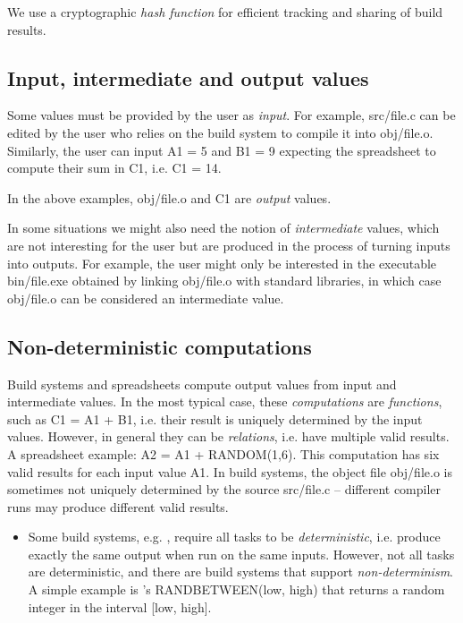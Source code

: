 We use a cryptographic \emph{hash function}  for
efficient tracking and sharing of build results.

\subsection{Input, intermediate and output values}

Some values must be provided by the user as \emph{input}. For example,
\textsf{src/file.c} can be edited by the user who relies on the build system to
compile it into \textsf{obj/file.o}. Similarly, the user can input \textsf{A1 = 5}
and \textsf{B1 = 9} expecting the spreadsheet to compute their sum in \textsf{C1},
i.e. \textsf{C1 = 14}.

In the above examples, \textsf{obj/file.o} and \textsf{C1} are \emph{output} values.

In some situations we might also need the notion of \emph{intermediate} values,
which are not interesting for the user but are produced in the process of turning
inputs into outputs. For example, the user might only be interested in the
executable \textsf{bin/file.exe} obtained by linking \textsf{obj/file.o} with
standard libraries, in which case \textsf{obj/file.o} can be considered an
intermediate value.

\subsection{Non-deterministic computations}

Build systems and spreadsheets compute output values from input and intermediate
values. In the most typical case, these \emph{computations} are \emph{functions},
such as \textsf{C1 = A1 + B1}, i.e. their result is uniquely determined by the
input values. However, in general they can be \emph{relations}, i.e. have
multiple valid results. A spreadsheet example: \textsf{A2 = A1 + RANDOM(1,6)}.
This computation has six valid results for each input value \textsf{A1}. In
build systems, the object file \textsf{obj/file.o} is sometimes not uniquely
determined by the source \textsf{src/file.c} -- different compiler runs may
produce different valid results.


\begin{itemize}

    \item Some build systems, e.g. \Buck, require all tasks to be
    \emph{deterministic}, i.e. produce exactly the same output when run on the
    same inputs. However, not all tasks are deterministic, and there are build
    systems that support \emph{non-determinism}. A simple example is \Excel's
    \textsf{RANDBETWEEN(low, high)} that returns a random integer in the
    interval \textsf{[low, high]}.

\end{itemize}

